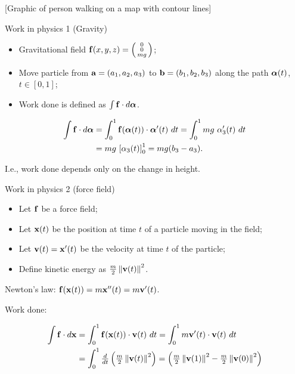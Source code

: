 [Graphic of person walking on a map with contour lines]





{Work in physics 1 (Gravity)}


\begin{itemize}
    \item Gravitational field \(\ff(x,y,z) = \left(\begin{smallmatrix}
              0 \\ 0 \\ mg
          \end{smallmatrix}\right)\);
    \item Move particle from \(\aa=(a_1,a_2,a_3)\) to \(\bb=(b_1,b_2,b_3)\) along the path \(\aalpha(t)\), \(t\in [0,1]\);
    \item Work done is defined as \(\int \ff \cdot d\aalpha\).
\end{itemize}

\[
    \begin{aligned}
        \int \ff \cdot d\aalpha & = \int_0^1 \ff(\aalpha(t)) \cdot \aalpha'(t) \ dt
        = \int_0^1 mg \ \alpha_3'(t) \ dt                                                 \\
                                & = mg \ {\left[ \alpha_3(t)\right]}_0^1 = mg(b_3 - a_3).
    \end{aligned}
\]

{I.e.,} work done depends only on the change in height.




    {Work in physics 2 (force field)}

\begin{itemize}
    \item Let \(\ff\) be a force field;
    \item Let \(\xx(t)\) be the position at time \(t\) of a particle moving in the field;
    \item Let \(\vv(t) = \xx'(t)\) be the velocity at time \(t\) of the particle;
    \item Define kinetic energy as \(\frac{m}{2} \norm{\vv(t)}^2\).
\end{itemize}

{Newton's law:}
\(\ff(\xx(t)) = m\xx''(t) = m \vv'(t)\).

    {Work done:}

\[
    \begin{aligned}
        \int \ff \cdot d\xx
         & = \int_0^1 \ff(\xx(t)) \cdot \vv(t) \ dt
        = \int_0^1 m\vv'(t) \cdot \vv(t) \ dt                                   \\
         & = \int_0^1 \tfrac{d}{dt} \left( \tfrac{m}{2} \norm{\vv(t)}^2 \right)
        = \left(  \tfrac{m}{2} \norm{\vv(1)}^2  -  \tfrac{m}{2} \norm{\vv(0)}^2   \right)
    \end{aligned}
\]

